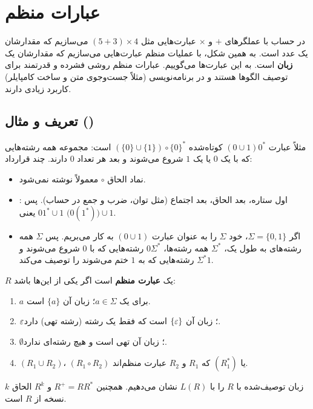 \chapter{عبارات منظم}

در حساب با عملگرهای $+$ و $\times$ عبارت‌هایی مثل $(5+3)\times4$ می‌سازیم که مقدارشان یک عدد است. به همین شکل، با عملیات منظم عبارت‌هایی می‌سازیم که مقدارشان یک \textbf{زبان} است. به این عبارت‌ها  می‌گوییم. عبارات منظم روشی فشرده و قدرتمند برای توصیف الگوها هستند و در برنامه‌نویسی (مثلاً جست‌وجوی متن و ساخت کامپایلر) کاربرد زیادی دارند.

\section{تعریف و مثال ()}

مثلاً عبارت $(0\cup1)0^*$ کوتاه‌شده $(\{0\}\cup\{1\})\circ\{0\}^*$ است: مجموعه همه رشته‌هایی که با یک $0$ یا یک $1$ شروع می‌شوند و بعد هر تعداد $0$ دارند. چند قرارداد:
\begin{itemize}
\item نماد الحاق $\circ$ معمولاً نوشته نمی‌شود.
\item {}: اول ستاره، بعد الحاق، بعد اجتماع (مثل توان، ضرب و جمع در حساب). پس $01^*\cup1$ یعنی $\big(0(1^*)\big)\cup1$.
\item اگر $\Sigma=\{0,1\}$، خود $\Sigma$ را به عنوان عبارت $(0\cup1)$ به کار می‌بریم. پس $\Sigma$ همه رشته‌های به طول یک، $\Sigma^*$ همه رشته‌ها، $0\Sigma^*$ رشته‌هایی که با $0$ شروع می‌شوند و $\Sigma^*1$ رشته‌هایی که به $1$ ختم می‌شوند را توصیف می‌کند.
\end{itemize}

\begin{definition}
$R$ یک \textbf{عبارت منظم} است اگر یکی از این‌ها باشد:
\begin{enumerate}
\item $a$ برای یک $a\in\Sigma$؛ زبان آن $\{a\}$ است.
\item $\varepsilon$؛ زبان آن $\{\varepsilon\}$ است که فقط یک رشته (رشته تهی) دارد.
\item $\emptyset$؛ زبان آن تهی است و هیچ رشته‌ای ندارد.
\item $(R_1\cup R_2)$، $(R_1\circ R_2)$ یا $(R_1^*)$ که $R_1$ و $R_2$ عبارت منظم‌اند.
\end{enumerate}
زبان توصیف‌شده با $R$ را با $L(R)$ نشان می‌دهیم. همچنین $R^+=RR^*$ و $R^k$ الحاق $k$ نسخه از $R$ است.
\end{definition}

